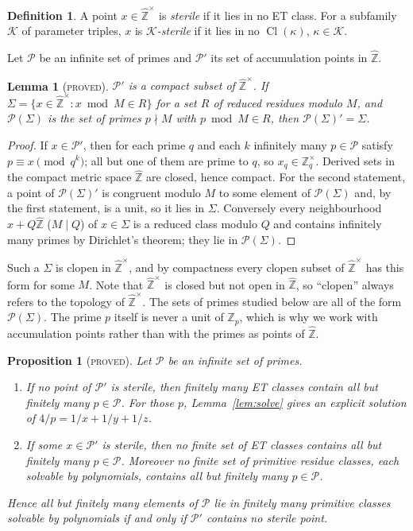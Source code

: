 \documentclass[11pt,reqno]{amsart}
\newtheorem{lemma}[theorem]{Lemma}
\newtheorem{proposition}[theorem]{Proposition}
\theoremstyle{definition}
\newtheorem{definition}[theorem]{Definition}
\newcommand{\Z}{\mathbb Z}
\newcommand{\Zh}{\widehat{\Z}}
\newcommand{\Zhu}{\widehat{\Z}^{\times}}
\newcommand{\Cl}{\operatorname{Cl}}
\newcommand{\status}[1]{\textup{\textsc{#1}}}
\begin{document}
\begin{definition}\label{def:sterile}
A point $x\in\Zhu$ is \emph{sterile} if it lies in no ET class.  For a
subfamily $\mathcal K$ of parameter triples, $x$ is
\emph{$\mathcal K$-sterile} if it lies in no $\Cl(\kappa)$,
$\kappa\in\mathcal K$.
\end{definition}

Let $\mathcal P$ be an infinite set of primes and $\mathcal P'$ its set of
accumulation points in $\Zh$.

\begin{lemma}[\status{proved}]\label{lem:accum}
$\mathcal P'$ is a compact subset of $\Zhu$.  If
$\Sigma=\{x\in\Zhu: x\bmod M\in R\}$ for a set $R$ of reduced residues
modulo $M$, and $\mathcal P(\Sigma)$ is the set of primes $p\nmid M$ with
$p\bmod M\in R$, then $\mathcal P(\Sigma)'=\Sigma$.
\end{lemma}

\begin{proof}
If $x\in\mathcal P'$, then for each prime $q$ and each $k$ infinitely many
$p\in\mathcal P$ satisfy $p\equiv x\pmod{q^k}$; all but one of them are
prime to $q$, so $x_q\in\Z_q^\times$.  Derived sets in the compact metric
space $\Zh$ are closed, hence compact.  For the second statement, a
point of $\mathcal P(\Sigma)'$ is congruent modulo $M$ to some element of
$\mathcal P(\Sigma)$ and, by the first statement, is a unit, so it lies
in $\Sigma$.  Conversely every
neighbourhood $x+Q\Zh$ ($M\mid Q$) of $x\in\Sigma$ is a reduced class
modulo $Q$ and contains infinitely many primes by Dirichlet's theorem;
they lie in $\mathcal P(\Sigma)$.
\end{proof}

Such a $\Sigma$ is clopen in $\Zhu$, and by compactness every clopen
subset of $\Zhu$ has this form for some $M$.  Note that $\Zhu$ is closed
but not open in $\Zh$, so ``clopen'' always refers to the topology of
$\Zhu$.  The sets of primes studied below are all of the form $\mathcal
P(\Sigma)$.  The prime $p$ itself is never a unit of $\Z_p$, which is why
we work with accumulation points rather than with the primes as points of
$\Zh$.

\begin{proposition}[\status{proved}]\label{prop:compact}
Let $\mathcal P$ be an infinite set of primes.
\begin{enumerate}
\item[(a)] If no point of $\mathcal P'$ is sterile, then finitely many ET
classes contain all but finitely many $p\in\mathcal P$.  For those $p$,
Lemma~\ref{lem:solve} gives an explicit solution of
$4/p=1/x+1/y+1/z$.
\item[(b)] If some $x\in\mathcal P'$ is sterile, then no finite set of ET
classes contains all but finitely many $p\in\mathcal P$.  Moreover no
finite set of primitive residue classes, each solvable by polynomials,
contains all but finitely many $p\in\mathcal P$.
\end{enumerate}
Hence all but finitely many elements of $\mathcal P$ lie in finitely many
primitive classes solvable by polynomials if and only if $\mathcal P'$
contains no sterile point.
\end{proposition}
\end{document}
